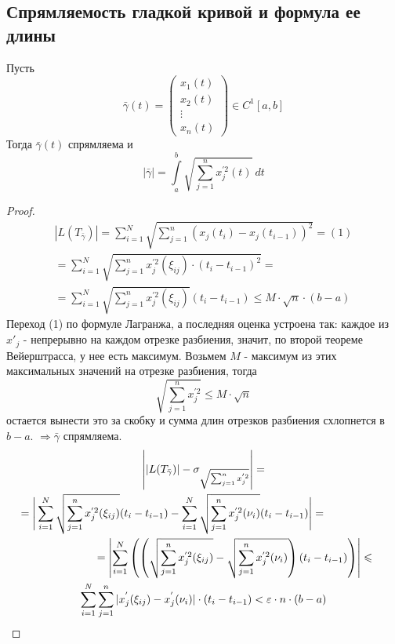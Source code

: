 \subsection{Спрямляемость гладкой кривой и формула ее длины}
\begin{theorem}
    Пусть 
    \[\bar{\gamma}(t) = 
    \begin{pmatrix}
    x_1(t)\\
    x_2(t)\\
    \vdots\\
    x_n(t)
    \end{pmatrix} \in C^1[a,b]\]
    Тогда $\bar{\gamma}(t)$ спрямляема и
    \[|\bar{\gamma}| = \int\limits_{a}^{b} \sqrt{\sum_{j = 1}^{n} x_j^{'2}(t)}\ dt\]
\end{theorem}
\begin{proof}
    \begin{multline*}
        |L(T_{\bar{\gamma}})| = \sum_{i = 1}^{N} \sqrt{ \sum_{j = 1}^{n}(x_j(t_i) - x_j(t_{i - 1}))^2} = (1)\\
        = \sum_{i = 1}^{N} \sqrt{\sum_{j = 1}^{n} x_j^{'2}(\xi_{ij}) \cdot (t_i - t_{i - 1})^2} =\\
        = \sum_{i = 1}^{N} \sqrt{\sum_{j = 1}^{n} x_j^{'2} (\xi_{ij})} (t_i - t_{i - 1}) \leqslant M \cdot \sqrt{n} \cdot (b - a)
    \end{multline*}
    Переход (1) по формуле Лагранжа, а последняя оценка устроена так: каждое из $x'_{j}$ - непрерывно на каждом отрезке разбиения, значит, по второй теореме Вейерштрасса, у нее есть максимум. Возьмем $M$ - максимум из этих максимальных значений на отрезке разбиения, тогда 
    \[\sqrt{\sum\limits_{j=1}^{n}x_j^{'2}}\leq M\cdot \sqrt{n}\]
    остается вынести это за скобку и сумма длин отрезков разбиения схлопнется в $b-a$.
    $\Rightarrow \bar{\gamma}$ спрямляема.
    \newpage
    \begin{multline*}
        \left| |L(T_{\bar{\gamma}})| - \sigma_{\sqrt{\sum_{j = 1}^{n} x_j^{'2}}} \right| =\\
        =\Bigg| \sum_{i = 1}^{N} \sqrt{\sum_{j = 1}^{n} x_j^{'2} (\xi_{ij})}(t_i - t_{i - 1}) - \sum_{i = 1}^{N} \sqrt{\sum_{j = 1}^{n} x_j^{'2} (\nu_{i})}(t_i - t_{i - 1}) \Bigg| =\tab[2cm]\\ 
        \tab[2cm]=\left| \sum_{i=1}^{N} \left( \left( \sqrt{\sum_{j = 1}^{n} x_j^{'2} (\xi_{ij})} - \sqrt{\sum_{j = 1}^{n} x_j^{'2} (\nu_{i})}  \right) (t_i - t_{i - 1}) \right) \right| \leqslant\\
        \sum_{i = 1}^{N} \sum_{j = 1}^{n} |x_j^{'} (\xi_{ij}) - x_j^{'} (\nu_i)| \cdot (t_i - t_{i - 1}) < \epsilon \cdot n \cdot (b - a)

\end{multline*}
\end{proof}
